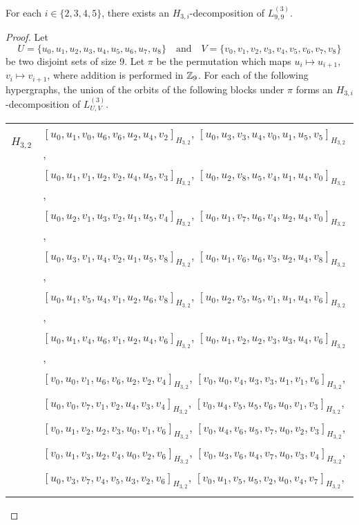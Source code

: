 \begin{subappendices}
\begin{example} \label{eg:H_3i-l99}
For each $i \in \{2,3,4,5\}$, there exists an $H_{3,i}$-decomposition of $L_{9,9}^{(3)}$.
\end{example}

\begin{proof}
Let
\[
    U = \{u_0, u_1, u_2, u_3, u_4, u_5, u_6, u_7, u_8\} \quad \text{and} \quad
    V = \{v_0, v_1, v_2, v_3, v_4, v_5, v_6, v_7, v_8\}
\]
be two disjoint sets of size 9.
Let $\pi$ be the permutation which maps $u_i \mapsto u_{i+1}$, $v_i \mapsto v_{i+1}$, where addition is performed in $\mathbb{Z}_9$.
For each of the following hypergraphs, the union of the orbits of the following blocks under $\pi$ forms an $H_{3,i}$-decomposition of $L_{U,V}^{(3)}$.

{ \small
\begin{longtable}{|c|l|}
\hline
$H_{3,2}$ &
  $[u_0, u_1, v_0, u_6, v_6, u_2, u_4, v_2]_{H_{3,2}}$,
  $[u_0, u_3, v_3, u_4, v_0, u_1, u_5, v_5]_{H_{3,2}}$, \\* &
  $[u_0, u_1, v_1, u_2, v_2, u_4, u_5, v_3]_{H_{3,2}}$,
  $[u_0, u_2, v_8, u_5, v_4, u_1, u_4, v_0]_{H_{3,2}}$, \\* &
  $[u_0, u_2, v_1, u_3, v_2, u_1, u_5, v_4]_{H_{3,2}}$,
  $[u_0, u_1, v_7, u_6, v_4, u_2, u_4, v_0]_{H_{3,2}}$, \\* &
  $[u_0, u_3, v_1, u_4, v_2, u_1, u_5, v_8]_{H_{3,2}}$,
  $[u_0, u_1, v_6, u_6, v_3, u_2, u_4, v_8]_{H_{3,2}}$, \\* &
  $[u_0, u_1, v_5, u_4, v_1, u_2, u_6, v_8]_{H_{3,2}}$,
  $[u_0, u_2, v_5, u_5, v_1, u_1, u_4, v_6]_{H_{3,2}}$, \\* &
  $[u_0, u_1, v_4, u_6, v_1, u_2, u_4, v_6]_{H_{3,2}}$,
  $[u_0, u_1, v_2, u_2, v_3, u_3, u_4, v_6]_{H_{3,2}}$, \\* &
  $[v_0, u_0, v_1, u_6, v_6, u_2, v_2, v_4]_{H_{3,2}}$,
  $[v_0, u_0, v_4, u_3, v_3, u_1, v_1, v_6]_{H_{3,2}}$, \\* &
  $[u_0, v_0, v_7, v_1, v_2, u_4, v_3, v_4]_{H_{3,2}}$,
  $[v_0, u_4, v_5, u_5, v_6, u_0, v_1, v_3]_{H_{3,2}}$, \\* &
  $[v_0, u_1, v_2, u_2, v_3, u_0, v_1, v_6]_{H_{3,2}}$,
  $[v_0, u_4, v_6, u_5, v_7, u_0, v_2, v_3]_{H_{3,2}}$, \\* &
  $[v_0, u_1, v_3, u_2, v_4, u_0, v_2, v_6]_{H_{3,2}}$,
  $[v_0, u_3, v_6, u_4, v_7, u_0, v_3, v_4]_{H_{3,2}}$, \\* &
  $[u_0, v_3, v_7, v_4, v_5, u_3, v_2, v_6]_{H_{3,2}}$,
  $[v_0, u_1, v_5, u_5, v_2, u_0, v_4, v_7]_{H_{3,2}}$, \\* &

\end{longtable}}
\end{proof}
\end{subappendices}
